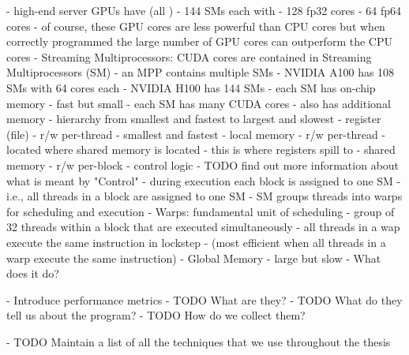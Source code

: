 					- high-end server GPUs have (all \cite{elster_nvidia_2022})
						- 144 SMs each with
							- 128 fp32 cores
							- 64 fp64 cores
						- of course, these GPU cores are less powerful than CPU cores but when correctly programmed the large number of GPU cores can outperform the CPU cores
				- Streaming Multiprocessors: CUDA cores are contained in Streaming Multiprocessors (SM) \cite{hwu_programming_2023}
					- an MPP contains multiple SMs
						- NVIDIA A100 has 108 SMs with 64 cores each \cite{hwu_programming_2023}
						- NVIDIA H100 has 144 SMs \cite{elster_nvidia_2022}
					- each SM has on-chip memory
						- fast but small
					- each SM has many CUDA cores
					- also has additional memory
						- hierarchy from smallest and fastest to largest and slowest
						- register (file)
							- r/w per-thread
							- smallest and fastest
						- local memory
							- r/w per-thread
							- located where shared memory is located
							- this is where registers spill to
						- shared memory
							- r/w per-block
					- control logic
						- TODO find out more information about what is meant by "Control"
					- during execution each block is assigned to one SM
						- i.e., all threads in a block are assigned to one SM \cite{hwu_programming_2023}
					- SM groups threads into warps for scheduling and execution
				- Warps: fundamental unit of scheduling
					- group of 32 threads within a block that are executed simultaneously
					- all threads in a wap execute the same instruction in lockstep
					- (most efficient when all threads in a warp execute the same instruction)
				- Global Memory
					- large but slow
	- What does it do?

- Introduce performance metrics
	- TODO What are they?
	- TODO What do they tell us about the program?
	- TODO How do we collect them?

- TODO Maintain a list of all the techniques that we use throughout the thesis

